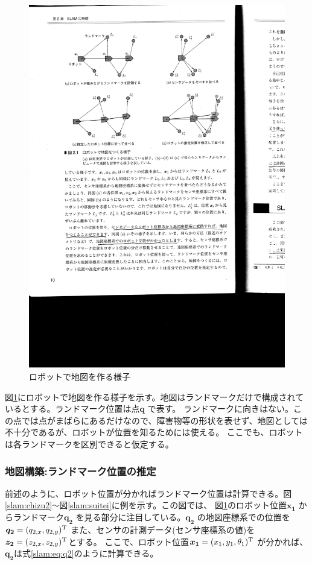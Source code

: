 \begin{figure}[h]
  \begin{center}
  \includegraphics[width=\linewidth]{img/slam_5.pdf}
  \caption{ロボットで地図を作る様子\cite{slam:nyumon}}
  \label{slam:chizu1}
  \end{center}
\end{figure}

図\ref{slam:chizu1}にロボットで地図を作る様子を示す。地図はランドマークだけで構成されているとする。ランドマーク位置は点$\bm{q}$ で表す。
ランドマークに向きはない。この点では点がまばらにあるだけなので、障害物等の形状を表せず、地図としては不十分であるが、ロボットが位置を知るためには使える。
ここでも、ロボットは各ランドマークを区別できると仮定する。

\subsubsection{地図構築:ランドマーク位置の推定}
前述のように、ロボット位置が分かればランドマーク位置は計算できる。図\ref{slam:chizu2}\verb|～|図\ref{slam:suitei}に例を示す。この図では、
図\ref{slam:chizu1}のロボット位置$\bm{x_1}$ からランドマーク$\bm{q_2}$ を見る部分に注目している。$\bm{q_2}$ の地図座標系での位置を
$\bm{q_2}=(q_{2,x},q_{2,y})^{\rm{T}}$ また、センサの計測データ(センサ座標系の値)を$\bm{z_2} = (z_{2,x},z_{2,y})^{\rm{T}}$とする。
ここで、ロボット位置$\bm{x_1} = (x_1, y_1,\theta_1)^{\rm{T}}$ が分かれば、$\bm{q_2}$は式\eqref{slam:eq:q2}のように計算できる。

